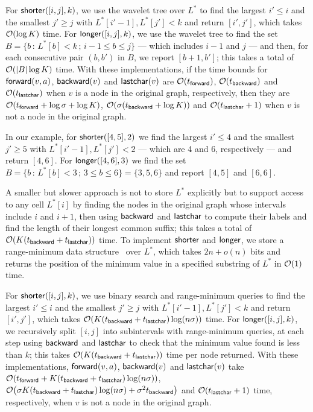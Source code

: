 For \(\mathsf{shorter}([i, j], k)\), we use the wavelet tree over $L^*$ to find the largest \(i' \leq i\) and the smallest \(j' \geq j\) with \(L^* [i' - 1], L^* [j'] < k\) and return \([i', j']\), which takes $\mathcal{O}\!\left( {\log K} \right)$ time.  For \(\mathsf{longer}([i, j], k)\), we use the wavelet tree to find the set \(B = \{b\,:\,L^* [b] < k\,;\,i - 1 \leq b \leq j\}\) --- which includes \(i - 1\) and $j$ --- and then, for each consecutive pair \((b, b')\) in $B$, we report \([b + 1, b']\); this takes a total of $\mathcal{O}\!\left( {|B| \log K} \right)$ time.  With these implementations, if the time bounds for \(\mathsf{forward}(v, a)\), \(\mathsf{backward}(v)\) and \(\mathsf{lastchar}(v)\) are $\mathcal{O}\!\left( {t_{\mathsf{forward}}} \right)$, $\mathcal{O}\!\left( {t_{\mathsf{backward}}} \right)$ and $\mathcal{O}\!\left( {t_{\mathsf{lastchar}}} \right)$ when $v$ is a node in the original graph, respectively, then they are $\mathcal{O}\!\left( {t_{\mathsf{forward}} + \log \sigma + \log K} \right)$, $\mathcal{O}\!\left( {\sigma (t_{\mathsf{backward}} + \log K)} \right)$ and $\mathcal{O}\!\left( {t_{\mathsf{lastchar}} + 1} \right)$ when $v$ is not a node in the original graph.

In our example, for \(\mathsf{shorter}([4, 5], 2)\) we find the largest \(i' \leq 4\) and the smallest \(j' \geq 5\) with \(L^* [i' - 1], L^* [j'] < 2\) --- which are 4 and 6, respectively --- and return \([4, 6]\).  For \(\mathsf{longer}([4, 6], 3)\) we find the set \(B = \{b\,:\,L^* [b] < 3\,;\,3 \leq b \leq 6\} = \{3, 5, 6\}\) and report \([4, 5]\) and \([6, 6]\).

A smaller but slower approach is not to store $L^*$ explicitly but to support access to any cell \(L^* [i]\) by finding the nodes in the original graph whose intervals include $i$ and \(i + 1\), then using $\mathsf{backward}$ and $\mathsf{lastchar}$ to compute their labels and find the length of their longest common suffix; this takes a total of $\mathcal{O}\!\left( {K (t_{\mathsf{backward}} + t_{\mathsf{lastchar}})} \right)$ time.  To implement $\mathsf{shorter}$ and $\mathsf{longer}$, we store a range-minimum data structure~\cite{fh2011} over $L^*$, which takes \(2 n + o (n)\) bits and returns the position of the minimum value in a specified substring of $L^*$ in $\mathcal{O}\!\left( {1} \right)$ time.

For \(\mathsf{shorter}([i, j], k)\), we use binary search and range-minimum queries to find the largest \(i' \leq i\) and the smallest
\(j' \geq j\) with \(L^* [i' - 1], L^* [j'] < k\) and return \([i', j']\), which takes $\mathcal{O}\!\left( {K (t_{\mathsf{backward}} + t_{\mathsf{lastchar}}) \log (n \sigma)} \right)$ time. 
For \(\mathsf{longer}([i, j], k)\), we recursively split \([i, j]\) into subintervals with range-minimum queries, at each step using $\mathsf{backward}$ and $\mathsf{lastchar}$ to check that the minimum value found is less than $k$; this takes $\mathcal{O}\!\left( {K (t_{\mathsf{backward}} + t_{\mathsf{lastchar}})} \right)$ time per node returned.  With these implementations, \(\mathsf{forward}(v, a)\), \(\mathsf{backward}(v)\) and \(\mathsf{lastchar}(v)\) take $\mathcal{O}\!\left( {t_{\mathsf{forward}} + K (t_{\mathsf{backward}} + t_{\mathsf{lastchar}}) \log (n \sigma)} \right)$, $\mathcal{O}\!\left( {\sigma K (t_{\mathsf{backward}} + t_{\mathsf{lastchar}}) \log (n \sigma) + \sigma^2 t_{\mathsf{backward}}} \right)$ and $\mathcal{O}\!\left( {t_{\mathsf{lastchar}} + 1} \right)$ time, respectively, when $v$ is not a node in the original graph.

